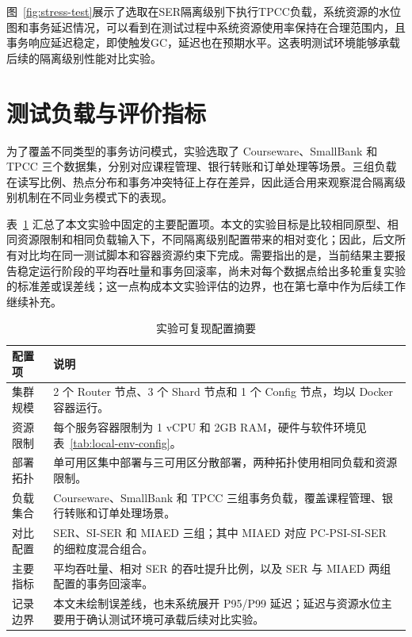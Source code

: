 图~\ref{fig:stress-test}展示了选取在SER隔离级别下执行TPCC负载，系统资源的水位图和事务延迟情况，可以看到在测试过程中系统资源使用率保持在合理范围内，且事务响应延迟稳定，即使触发GC，延迟也在预期水平。这表明测试环境能够承载后续的隔离级别性能对比实验。

\section{测试负载与评价指标}
为了覆盖不同类型的事务访问模式，实验选取了 Courseware、SmallBank 和 TPCC 三个数据集，分别对应课程管理、银行转账和订单处理等场景。三组负载在读写比例、热点分布和事务冲突特征上存在差异，因此适合用来观察混合隔离级别机制在不同业务模式下的表现。

表~\ref{tab:experiment-reproducibility-config} 汇总了本文实验中固定的主要配置项。本文的实验目标是比较相同原型、相同资源限制和相同负载输入下，不同隔离级别配置带来的相对变化；因此，后文所有对比均在同一测试脚本和容器资源约束下完成。需要指出的是，当前结果主要报告稳定运行阶段的平均吞吐量和事务回滚率，尚未对每个数据点给出多轮重复实验的标准差或误差线；这一点构成本文实验评估的边界，也在第七章中作为后续工作继续补充。

\begin{table}[htbp]
    \centering
    \small
    \renewcommand{\arraystretch}{1.25}
    \caption{实验可复现配置摘要}
    \label{tab:experiment-reproducibility-config}
    \begin{tabularx}{\textwidth}{p{3.0cm} X}
        \toprule
        配置项 & 说明 \\
        \midrule
        集群规模 & 2 个 Router 节点、3 个 Shard 节点和 1 个 Config 节点，均以 Docker 容器运行。 \\
        资源限制 & 每个服务容器限制为 1 vCPU 和 2GB RAM，硬件与软件环境见表~\ref{tab:local-env-config}。 \\
        部署拓扑 & 单可用区集中部署与三可用区分散部署，两种拓扑使用相同负载和资源限制。 \\
        负载集合 & Courseware、SmallBank 和 TPCC 三组事务负载，覆盖课程管理、银行转账和订单处理场景。 \\
        对比配置 & SER、SI-SER 和 MIAED 三组；其中 MIAED 对应 PC-PSI-SI-SER 的细粒度混合组合。 \\
        主要指标 & 平均吞吐量、相对 SER 的吞吐提升比例，以及 SER 与 MIAED 两组配置的事务回滚率。 \\
        记录边界 & 本文未绘制误差线，也未系统展开 P95/P99 延迟；延迟与资源水位主要用于确认测试环境可承载后续对比实验。 \\
        \bottomrule
    \end{tabularx}
\end{table}

